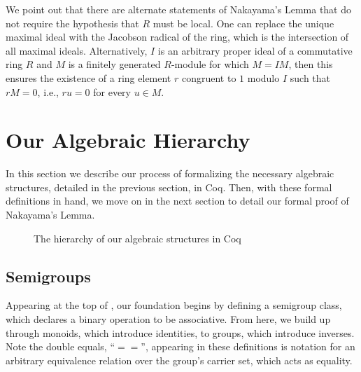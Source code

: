 \documentclass[referee,sn-mathphys]{sn-jnl}
\theoremstyle{definition}
\theoremstyle{remark}
\numberwithin{equation}{section}
\numberwithin{figure}{subsection}
\begin{document}
We point out that there are alternate statements of Nakayama's Lemma that do
not require the hypothesis that $R$ must be local. One can replace the unique
maximal ideal with the Jacobson radical of the ring, which is the intersection
of all maximal ideals. Alternatively, $I$ is an arbitrary proper ideal of a
commutative ring $R$ and $M$ is a finitely generated $R$-module for which
$M=I M$, then this ensures the existence of a ring element $r$ congruent to
$1$ modulo $I$ such that $r M = 0$, i.e., $r u = 0$ for every $u \in M$. 

\section{Our Algebraic Hierarchy}
In this section we describe our process of formalizing the necessary algebraic
structures, detailed in the previous section, in Coq. Then, with these formal definitions 
 in hand, we move
on in the next section to detail our formal proof of Nakayama's Lemma.

\begin{figure}[t]
  \caption{The hierarchy of our algebraic structures in Coq}
  \centering
  \label{alg-heirarchy: F}
\end{figure}

\subsection{Semigroups} 
Appearing at the top of , our
 foundation begins by defining a semigroup class, which declares a binary
operation to be associative. From here, we build up through monoids, which
introduce identities, to groups, which introduce inverses. Note the double
equals, ``$==$'', appearing in these definitions is notation for an arbitrary
equivalence relation over the group's carrier set, which acts as equality.
\end{document}
